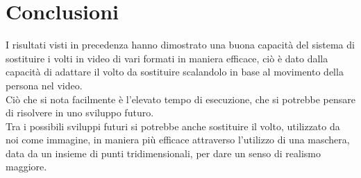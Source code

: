 \documentclass{report}
\begin{document}
\chapter{Conclusioni}
I risultati visti in precedenza hanno dimostrato una buona capacità del sistema di sostituire i volti in video di vari formati in maniera efficace, ciò è dato dalla capacità di adattare il volto da sostituire scalandolo in base al movimento della persona nel video. \\
Ciò che si nota facilmente è l’elevato tempo di esecuzione, che si potrebbe pensare di risolvere in uno sviluppo futuro. \\
Tra i possibili sviluppi futuri si potrebbe anche sostituire il volto, utilizzato da noi come immagine, in maniera più efficace attraverso l’utilizzo di una maschera, data da un insieme di punti tridimensionali, per dare un senso di realismo maggiore.
\end{document}

